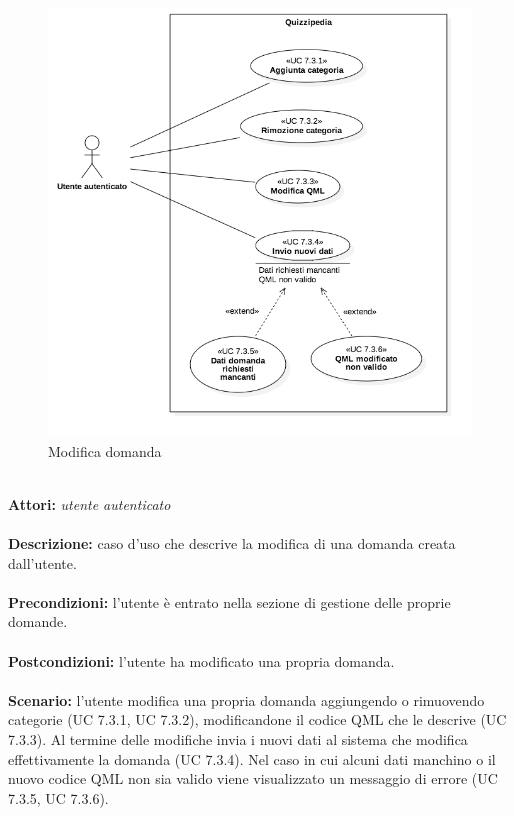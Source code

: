 \documentclass[a4paper,11pt]{article}
\begin{document}
\begin{figure}[h!]
\centering
\includegraphics[scale=0.6]{../immagini/UC7_3.png}
\caption{Modifica domanda}
\end{figure}
\ \\
\textbf{Attori:} \textit{utente autenticato}
\\ \\
\textbf{Descrizione:} caso d'uso che descrive la modifica di una domanda creata dall'utente.\\
\\
\textbf{Precondizioni:} l'utente è entrato nella sezione di gestione delle proprie domande.\\
\\
\textbf{Postcondizioni:} l’utente ha modificato una propria domanda.\\
\\
\textbf{Scenario:} l’utente modifica una propria domanda aggiungendo o rimuovendo categorie (UC 7.3.1, UC 7.3.2), modificandone il codice QML che le descrive (UC 7.3.3). Al termine delle modifiche invia i nuovi dati al sistema che modifica effettivamente la domanda (UC 7.3.4). Nel caso in cui alcuni dati manchino o il nuovo codice QML non sia valido viene visualizzato un messaggio di errore (UC 7.3.5, UC 7.3.6).\\
\end{document}
